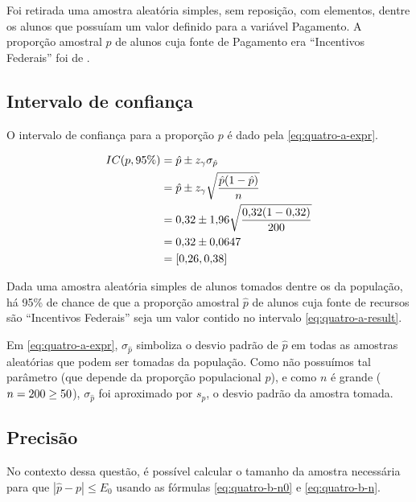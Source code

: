 

	Foi retirada uma amostra aleatória simples, sem reposição, com \QUATROn
	elementos, dentre os \QUATRON alunos que possuíam um valor definido para a
	variável Pagamento. A proporção amostral $\hat{p}$ de alunos cuja fonte de
	Pagamento era ``Incentivos Federais'' foi de \QUATROpAmostral.

\subsection{Intervalo de confiança}

	O intervalo de confiança para a proporção $p$ é dado pela
	\autoref{eq:quatro-a-expr}.

	\begin{align} 
		IC(p, 95\%) \label{eq:quatro-a-expr}
					&= \hat{p} \pm z_\gamma \sigma_{\hat{p}} \\
					\label{eq:quatro-a-estim}
					&= \hat{p} \pm z_\gamma \sqrt{\frac{\hat{p}(1-\hat{p})}{n}} \\
					&= \num{0.32} \pm \num{1.96} \sqrt{\frac{\num{0.32} (1- \num{0.32})}{200}} \nonumber \\
					&= \num{0.32} \pm \num{0.0647} \nonumber \\
					\label{eq:quatro-a-result}
					&= [\num{0.26}, \num{0.38}]
	\end{align}

	Dada uma amostra aleatória simples de \QUATROn alunos tomados dentre os
	\QUATRON da população, há 95\% de chance de que a proporção amostral $\hat{p}$ 
    de alunos cuja fonte de recursos são ``Incentivos Federais'' seja um valor 
    contido no intervalo \eqref{eq:quatro-a-result}.

	Em \eqref{eq:quatro-a-expr}, $\sigma_{\hat{p}}$ simboliza o desvio
	padrão de $\hat{p}$ em todas as amostras aleatórias que podem ser
	tomadas da população. Como não possuímos tal parâmetro (que depende da 
    proporção populacional $p$), e como $n$ é grande ($n = 200 \geq 50$),
    $\sigma_{\hat{p}}$ foi aproximado por $s_{\hat{p}}$, o desvio padrão da 
    amostra tomada.

\subsection{Precisão}

	No contexto dessa questão, é possível calcular o tamanho da amostra
	necessária para que $|\hat{p} - p| \leq E_0$ usando as fórmulas
	\eqref{eq:quatro-b-n0} e \eqref{eq:quatro-b-n}.

